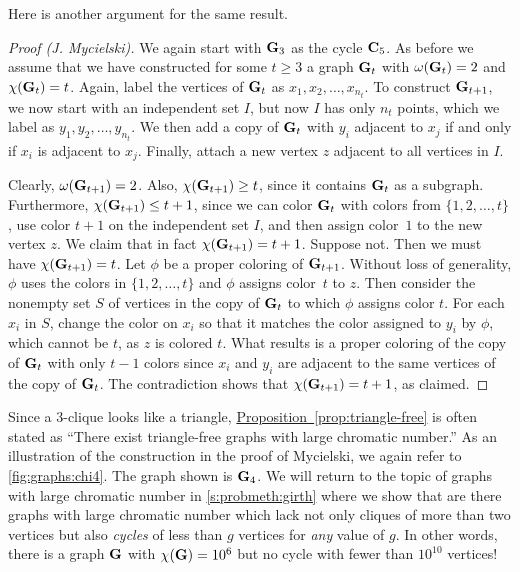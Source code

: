 Here is another argument for the same result.

\begin{proof}[Proof (J. Mycielski)]
  We again start with $\mathbf{G}_3$ as the cycle $\mathbf{C}_5$.  As before we
  assume that we have constructed for some $t\ge3$ a graph $\mathbf{G}_t$
  with $\omega(\mathbf{G}_t)=2$ and $\chi(\mathbf{G}_t) = t$.  Again, label the
  vertices of $\mathbf{G}_t$ as $x_1,x_2,\dots,x_{n_t}$.  To construct
  $\mathbf{G}_{t+1}$, we now start with an independent set $I$, but now $I$
  has only $n_t$ points, which we label as $y_1,y_2,\dots,y_{n_t}$.  We
  then add a copy of $\mathbf{G}_t$ with $y_i$ adjacent to $x_j$ if and only
  if $x_i$ is adjacent to $x_j$.  Finally, attach a new vertex $z$
  adjacent to all vertices in $I$.

  Clearly, $\omega(\mathbf{G}_{t+1})=2$.  Also,
  $\chi(\mathbf{G}_{t+1})\ge t$, since it contains $\mathbf{G}_t$ as a subgraph.
  Furthermore,
  $\chi(\mathbf{G}_{t+1})\leq t+1$, since we can color $\mathbf{G}_t$ with colors
  from $\{1,2,\dots,t\}$, use color $t+1$ on the independent set $I$,
  and then assign color~$1$ to the new vertex $z$. We claim that in fact
  $\chi(\mathbf{G}_{t+1})=t+1$. Suppose not. Then we must have
  $\chi(\mathbf{G}_{t+1})=t$.  Let $\phi$ be a proper
  coloring of $\mathbf{G}_{t+1}$.  Without loss of generality, $\phi$ uses
  the colors in $\{1,2,\dots,t\}$ and $\phi$ assigns color~$t$ to $z$.
  Then consider the nonempty set $S$ of vertices in the copy of
  $\mathbf{G}_t$ to which $\phi$ assigns color $t$.  For each $x_i$ in $S$,
  change the color on $x_i$ so that it matches the color assigned to
  $y_i$ by $\phi$, which cannot be $t$, as $z$ is colored $t$.  What
  results is a proper coloring of the copy of $\mathbf{G}_t$ with only $t-1$
  colors since $x_i$ and $y_i$ are adjacent to the same vertices of
  the copy of $\mathbf{G}_t$.  The contradiction shows that
  $\chi(\mathbf{G}_{t+1})=t+1$, as claimed.
\end{proof}

Since a $3$-clique looks like a triangle,
\hyperref[prop:triangle-free]{Proposition~\ref*{prop:triangle-free}}
is often stated as ``There exist triangle-free graphs with large
chromatic number.'' As an illustration of the construction in the
proof of Mycielski, we again refer to \autoref{fig:graphs:chi4}.  The
graph shown is $\mathbf{G}_4$. We will return to the topic of graphs with
large chromatic number in \autoref{s:probmeth:girth} where we show
that are there graphs with large chromatic number which lack not only
cliques of more than two vertices but also \emph{cycles} of less than
$g$ vertices for \emph{any} value of $g$. In other words, there is a
graph $\mathbf{G}$ with $\chi(\mathbf{G})=10^6$ but no cycle with fewer than
$10^{10}$ vertices!


